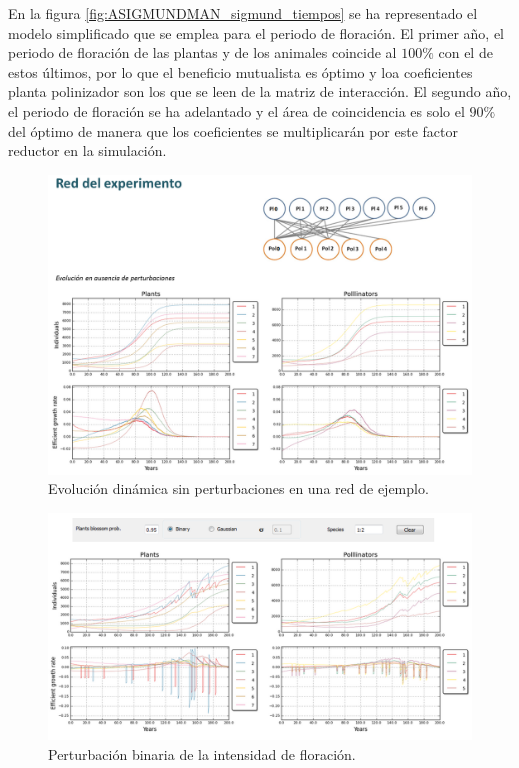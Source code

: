 En la figura \ref{fig:ASIGMUNDMAN_sigmund_tiempos} se ha representado el modelo simplificado que se emplea para el periodo de floración. El primer año, el periodo de floración de las
plantas y de los animales coincide al $100\%$ con el de estos últimos, por lo que el beneficio mutualista es óptimo y loa coeficientes planta polinizador son los que se leen de la
matriz de interacción. El segundo año, el periodo de floración se ha adelantado y el área de coincidencia es solo el $90\%$ del óptimo de manera que los coeficientes se multiplicarán
por este factor reductor en la simulación.

\begin{figure}[h!]
\centering
\includegraphics[scale=1]{ManFigs/sigmund_red_exper.png}
\caption{Evolución dinámica sin perturbaciones en una red de ejemplo.}
\label{fig:ASIGMUNDMAN_sigmund_red_exper}
\end{figure}

\begin{figure}[h!]
\centering
\includegraphics[scale=1]{ManFigs/sigmund_oscilacion_intensidad.png}
\caption{Perturbación binaria de la intensidad de floración.}
\label{fig:ASIGMUNDMAN_sigmund_oscilacion_intensidad}
\end{figure}

